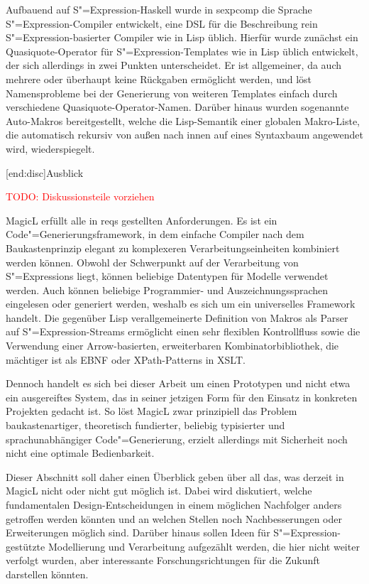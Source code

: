 \documentclass[12pt, a4paper, bibgerm]{scrbook}
\newcommand{\todo}[1]{
  \textcolor{red}{TODO: #1}
}
\newcommand\lsection{}
\newcommand\cref{}
\newcommand{\sexp}{S"=Expression}
\newcommand{\sexps}{S"=Expressions}
\newcommand{\cgen}{Code"=Generierung}
\begin{document}
Aufbauend auf \sexp{}-Haskell wurde in \cref{sexpcomp} die Sprache
\sexp{}-Compiler entwickelt, eine DSL für die Beschreibung rein
\sexp{}-basierter Compiler wie in Lisp üblich. Hierfür wurde zunächst
ein Quasiquote-Operator für \sexp{}-Templates wie in Lisp üblich
entwickelt, der sich allerdings in zwei Punkten unterscheidet. Er ist
allgemeiner, da auch mehrere oder überhaupt keine Rückgaben ermöglicht
werden, und löst Namensprobleme bei der Generierung von weiteren
Templates einfach durch verschiedene Quasiquote-Operator-Namen. Darüber
hinaus wurden sogenannte Auto-Makros bereitgestellt, welche die
Lisp-Semantik einer globalen Makro-Liste, die automatisch rekursiv von
außen nach innen auf eines Syntaxbaum angewendet wird, wiederspiegelt.

\lsection[end:disc]{Ausblick}

\todo{Diskussionsteile vorziehen}

MagicL erfüllt alle in \cref{reqs} gestellten Anforderungen. Es ist ein
\cgen{}sframework, in dem einfache Compiler nach dem Baukastenprinzip
elegant zu komplexeren Verarbeitungseinheiten kombiniert werden
können. Obwohl der Schwerpunkt auf der Verarbeitung von \sexps{} liegt,
können beliebige Datentypen für Modelle verwendet werden. Auch können
beliebige Programmier- und Auszeichnungssprachen eingelesen oder
generiert werden, weshalb es sich um ein universelles Framework handelt.
Die gegenüber Lisp verallgemeinerte Definition von Makros als Parser
auf \sexp{}-Streams ermöglicht einen sehr flexiblen Kontrollfluss sowie
die Verwendung einer Arrow-basierten, erweiterbaren
Kombinatorbibliothek, die mächtiger ist als EBNF oder XPath-Patterns
in XSLT.

Dennoch handelt es sich bei dieser Arbeit um einen Prototypen und nicht
etwa ein ausgereiftes System, das in seiner jetzigen Form für den
Einsatz in konkreten Projekten gedacht ist. So löst MagicL zwar
prinzipiell das Problem baukastenartiger, theoretisch fundierter,
beliebig typisierter und sprachunabhängiger \cgen{}, erzielt allerdings
mit Sicherheit noch nicht eine optimale Bedienbarkeit.

Dieser Abschnitt soll daher einen Überblick geben über all das, was
derzeit in MagicL nicht oder nicht gut möglich ist. Dabei wird
diskutiert, welche fundamentalen Design-Entscheidungen in einem möglichen
Nachfolger anders getroffen werden könnten und an welchen Stellen noch
Nachbesserungen oder Erweiterungen möglich sind. Darüber hinaus sollen
Ideen für \sexp{}-gestützte Modellierung und Verarbeitung aufgezählt
werden, die hier nicht weiter verfolgt wurden, aber interessante
Forschungsrichtungen für die Zukunft darstellen könnten.
\end{document}
